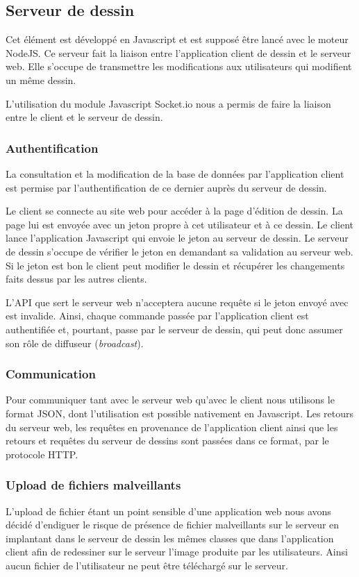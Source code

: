 \documentclass[a4paper]{article}
\begin{document}
\subsection{Serveur de dessin}
Cet élément est développé en Javascript et est supposé être lancé avec le moteur \cite{NodeJS}NodeJS. Ce serveur fait la liaison entre l'application client de dessin et le serveur web. Elle s'occupe de transmettre les modifications aux utilisateurs qui modifient un même dessin.

L'utilisation du module Javascript Socket.io nous a permis de faire la liaison entre le client et le serveur de dessin.

\subsubsection{Authentification}
La consultation et la modification de la base de données par l'application client est permise par l'authentification de ce dernier auprès du serveur de dessin.

Le client se connecte au site web pour accéder à la page d'édition de dessin. La page lui est envoyée avec un jeton propre à cet utilisateur et à ce dessin. Le client lance l'application Javascript qui envoie le jeton au serveur de dessin. Le serveur de dessin s'occupe de vérifier le jeton en demandant sa validation au serveur web. Si le jeton est bon le client peut modifier le dessin et récupérer les changements faits dessus par les autres clients.

L'API que sert le serveur web n'acceptera aucune requête si le jeton envoyé avec est invalide. Ainsi, chaque commande passée par l'application client est authentifiée et, pourtant, passe par le serveur de dessin, qui peut donc assumer son rôle de diffuseur (\textit{broadcast}).

\subsubsection{Communication}
Pour communiquer tant avec le serveur web qu'avec le client nous utilisons le format JSON, dont l'utilisation est possible nativement en Javascript. Les retours du serveur web, les requêtes en provenance de l'application client ainsi que les retours et requêtes du serveur de dessins sont passées dans ce format, par le protocole HTTP.

\subsubsection{Upload de fichiers malveillants}
L'upload de fichier étant un point sensible d'une application web nous avons décidé d'endiguer le risque de présence de fichier malveillants sur le serveur en implantant dans le serveur de dessin les mêmes classes que dans l'application client afin de redessiner sur le serveur l'image produite par les utilisateurs. Ainsi aucun fichier de l'utilisateur ne peut être téléchargé sur le serveur.
\end{document}
